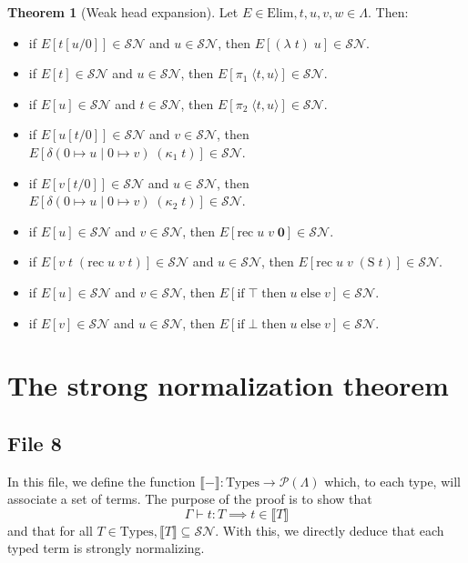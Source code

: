 \documentclass{article}
\newcommand{\SN}[0]{\mathcal{SN}}
\newcommand{\ife}[3]{\mathrm{if}\;#1\;\mathrm{then}\;#2\;\mathrm{else}\;#3}
\newcommand{\bO}[0]{\boldsymbol{0}}
\newcommand{\Ss}[0]{\mathrm{S}}
\newcommand{\rec}[0]{\mathrm{rec}}
\newcommand{\Tt}[0]{\top}
\newcommand{\Ff}[0]{\bot}
\newcommand{\deltacase}[3]{\delta(0\mapsto #1\mid 0 \mapsto #2)\;#3}
\newcommand{\Types}[0]{\mathrm{Types}}
\newcommand{\Elim}[0]{\mathrm{Elim}}
\theoremstyle{definition}
\newtheorem{them}{Theorem}
\begin{document}
\begin{them}[Weak head expansion]
    Let $E\in\Elim, t,u,v,w\in\Lambda$. Then:
    \begin{itemize}
        \item if $E[t[u/0]]\in\SN$ and $u\in\SN$, then $E[(\lambda\;t)\;u]\in\SN$.
        \item if $E[t]\in\SN$ and $u\in\SN$, then $E[\pi_1\;\langle t,u\rangle]\in\SN$.
        \item if $E[u]\in\SN$ and $t\in\SN$, then $E[\pi_2\;\langle t,u\rangle]\in\SN$.
        \item if $E[u[t/0]]\in\SN$ and $v\in\SN$, then $E[\deltacase{u}{v}{(\kappa_1\;t)}]\in\SN$.
        \item if $E[v[t/0]]\in\SN$ and $u\in\SN$, then $E[\deltacase{u}{v}{(\kappa_2\;t)}]\in\SN$.
        \item if $E[u]\in\SN$ and $v\in\SN$, then $E[\rec\;u\;v\;\bO]\in\SN$.
        \item if $E[v\;t\;(\rec\;u\;v\;t)]\in\SN$ and $u\in\SN$, then $E[\rec\;u\;v\;(\Ss\;t)]\in\SN$.
        \item if $E[u]\in\SN$ and $v\in\SN$, then $E[\ife{\Tt}{u}{v}]\in\SN$.
        \item if $E[v]\in\SN$ and $u\in\SN$, then $E[\ife{\Ff}{u}{v}]\in\SN$.
    \end{itemize}
\end{them}

\section{The strong normalization theorem}

\subsection{File 8}

In this file, we define the function $\llbracket-\rrbracket : \Types \to \mathcal P(\Lambda)$ which, to each
type, will associate a set of terms. The purpose of the proof is to show that
$$\Gamma\vdash t : T \implies t \in \llbracket T \rrbracket$$
and that for all $T\in\Types, \llbracket T\rrbracket \subseteq \SN$. With this, we directly deduce that each
typed term is strongly normalizing.
\end{document}
